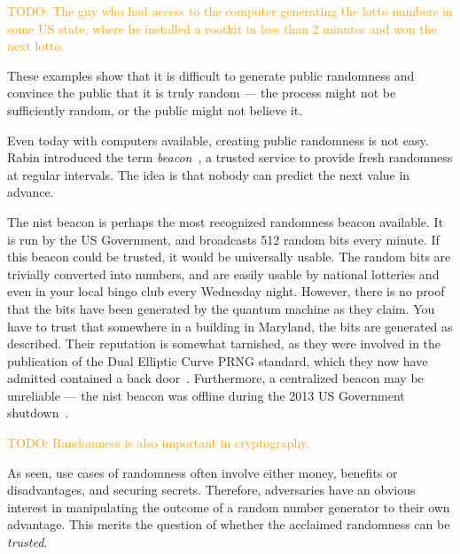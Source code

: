 \textcolor{orange}{TODO: The guy who had access to the computer generating the lotto numbers in some US state, where he installed a rootkit in less than 2 minutes and won the next lotto.}

These examples show that it is difficult to generate public randomness and convince the public that it is truly random --- the process might not be sufficiently random, or the public might not believe it.

Even today with computers available, creating public randomness is not easy. Rabin introduced the term \emph{beacon}~\cite{rabin1983transaction}, a trusted service to provide fresh randomness at regular intervals. The idea is that nobody can predict the next value in advance.

The \gls{nist} beacon is perhaps the most recognized randomness beacon available.
It is run by the US Government, and broadcasts 512 random bits every minute.
If this beacon could be trusted, it would be universally usable. The random bits are trivially converted into numbers, and are easily usable by national lotteries and even in your local bingo club every Wednesday night.
However, there is no proof that the bits have been generated by the quantum machine as they claim. You have to trust that somewhere in a building in Maryland, the bits are generated as described.
Their reputation is somewhat tarnished, as they were involved in the publication of the Dual Elliptic Curve PRNG standard, which they now have admitted contained a back door~\cite{nist2014backdoor}.
Furthermore, a centralized beacon may be unreliable --- the \gls{nist} beacon was offline during the 2013 US Government shutdown~\cite{bonneau2015bitcoin}.

\textcolor{orange}{TODO: Randomness is also important in cryptography.}

As seen, use cases of randomness often involve either money, benefits or disadvantages, and securing secrets. Therefore, adversaries have an obvious interest in manipulating the outcome of a random number generator to their own advantage.
This merits the question of whether the acclaimed randomness can be \emph{trusted}.

